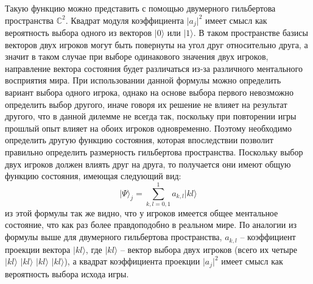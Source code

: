 Такую функцию можно представить с помощью двумерного гильбертова пространства $\mathbb{C}^{2}$.
Квадрат модуля коэффициента $\vert a_{j} \vert^{2}$ имеет смысл как вероятность выбора одного из
векторов $\vert 0 \rangle$ или $\vert 1 \rangle$.
В таком пространстве базисы векторов двух игроков могут быть повернуты на угол друг относительно друга,
а значит в таком случае при выборе одинакового значения двух игроков, направление вектора состояния
будет различаться из-за различного ментального восприятия мира.
При использовании данной формулы можно определить вариант выбора одного игрока, однако на основе
выбора первого невозможно определить выбор другого, иначе говоря их решение не влияет на результат
другого, что в данной дилемме не всегда так, поскольку при повторении игры прошлый опыт влияет на
обоих игроков одновременно.
Поэтому необходимо определить другую функцию состояния, которая впоследствии позволит правильно
определить размерность гильбертова пространства.
Поскольку выбор двух игроков должен влиять друг на друга, то получается они имеют общую функцию
состояния, имеющая следующий вид:
\begin{equation}
    \vert \Psi \rangle_{j} = \sum_{k,l=0,1}^{1} a_{k,l} \vert kl \rangle
\end{equation}
из этой формулы так же видно, что у игроков имеется общее ментальное состояние, что как раз более
правдоподобно в реальном мире.
По аналогии из формулы выше для двумерного гильбертова пространства, $a_{k,l}$ – коэффициент
проекции вектора $\vert kl \rangle$, где $\vert kl \rangle$ – вектор выбора двух игроков
(всего их четыре $\vert kl \rangle$ $\vert kl \rangle$ $\vert kl \rangle$ $\vert kl \rangle$),
а квадрат коэффициента проекции $\vert a_{j} \vert^{2}$ имеет смысл как вероятность выбора исхода игры.
